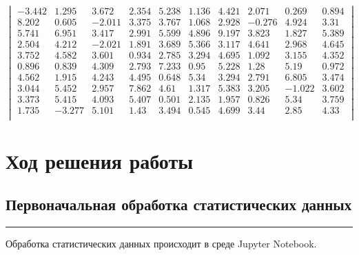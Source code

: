 \documentclass[a4paper, 14pt]{extarticle}
\begin{document}
\begin{equation*}
    \begin{vmatrix}
        -3.442 & 1.295 & 3.672 & 2.354 & 5.238 & 1.136 & 4.421 & 2.071 & 0.269 & 0.894 \\
        8.202 & 0.605 & -2.011 & 3.375 & 3.767 & 1.068 & 2.928 & -0.276 & 4.924 & 3.31 \\
        5.741 & 6.951 & 3.417 & 2.991 & 5.599 & 4.896 & 9.197 & 3.823 & 1.827 & 5.389 \\
        2.504 & 4.212 & -2.021 & 1.891 & 3.689 & 5.366 & 3.117 & 4.641 & 2.968 & 4.645 \\
        3.752 & 4.582 & 3.601 & 0.934 & 2.785 & 3.294 & 4.695 & 1.092 & 3.155 & 4.352 \\
        0.896 & 0.839 & 4.309 & 2.793 & 7.233 & 0.95 & 5.228 & 1.28 & 5.19 & 0.972 \\
        4.562 & 1.915 & 4.243 & 4.495 & 0.648 & 5.34 & 3.294 & 2.791 & 6.805 & 3.474 \\
        3.044 & 5.452 & 2.957 & 7.862 & 4.61 & 1.317 & 5.383 & 3.205 & -1.022 & 3.602 \\
        3.373 & 5.415 & 4.093 & 5.407 & 0.501 & 2.135 & 1.957 & 0.826 & 5.34 & 3.759 \\
        1.735 & -3.277 & 5.101 & 1.43 & 3.494 & 0.545 & 4.699 & 3.44 & 2.85 & 4.33 \\
    \end{vmatrix}
\end{equation*}

\section*{Ход решения работы}
\subsection*{Первоначальная обработка статистических данных}\vspace{-20pt}\rule{\linewidth}{0.1mm}

Обработка статистических данных происходит в среде Jupyter Notebook.
\end{document}
